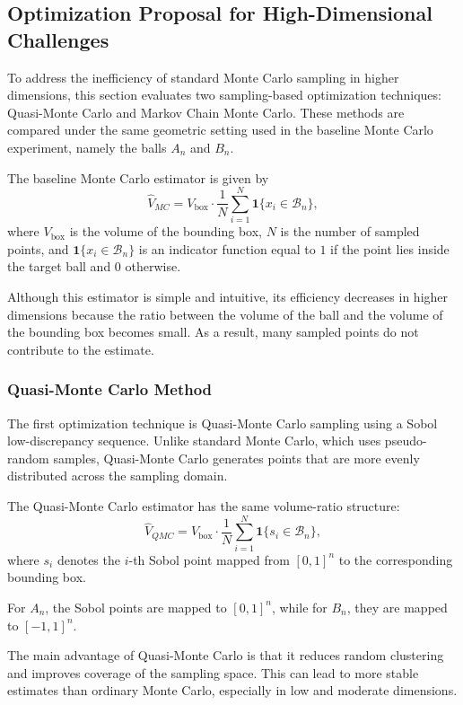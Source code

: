 \subsection{Optimization Proposal for High-Dimensional Challenges}

To address the inefficiency of standard Monte Carlo sampling in higher dimensions, this section evaluates two sampling-based optimization techniques: Quasi-Monte Carlo and Markov Chain Monte Carlo. These methods are compared under the same geometric setting used in the baseline Monte Carlo experiment, namely the balls $A_n$ and $B_n$.

The baseline Monte Carlo estimator is given by
\[
\widehat{V}_{MC}
=
V_{\text{box}}
\cdot
\frac{1}{N}
\sum_{i=1}^{N}
\mathbf{1}\{x_i \in \mathcal{B}_n\},
\]
where $V_{\text{box}}$ is the volume of the bounding box, $N$ is the number of sampled points, and $\mathbf{1}\{x_i \in \mathcal{B}_n\}$ is an indicator function equal to $1$ if the point lies inside the target ball and $0$ otherwise.

Although this estimator is simple and intuitive, its efficiency decreases in higher dimensions because the ratio between the volume of the ball and the volume of the bounding box becomes small. As a result, many sampled points do not contribute to the estimate.

\subsubsection{Quasi-Monte Carlo Method}

The first optimization technique is Quasi-Monte Carlo sampling using a Sobol low-discrepancy sequence. Unlike standard Monte Carlo, which uses pseudo-random samples, Quasi-Monte Carlo generates points that are more evenly distributed across the sampling domain.

The Quasi-Monte Carlo estimator has the same volume-ratio structure:
\[
\widehat{V}_{QMC}
=
V_{\text{box}}
\cdot
\frac{1}{N}
\sum_{i=1}^{N}
\mathbf{1}\{s_i \in \mathcal{B}_n\},
\]
where $s_i$ denotes the $i$-th Sobol point mapped from $[0,1]^n$ to the corresponding bounding box.

For $A_n$, the Sobol points are mapped to $[0,1]^n$, while for $B_n$, they are mapped to $[-1,1]^n$.

The main advantage of Quasi-Monte Carlo is that it reduces random clustering and improves coverage of the sampling space. This can lead to more stable estimates than ordinary Monte Carlo, especially in low and moderate dimensions.

